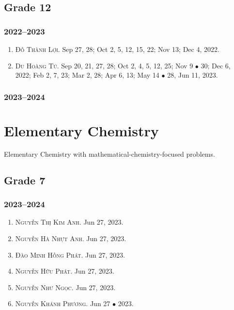 \documentclass{article}
\begin{document}

\subsection{Grade 12}

\subsubsection{2022--2023}

\begin{enumerate}
	\item \textsc{Đỗ Thành Lợi.} {\sf[In]} Sep 27, 28; Oct 2, 5, 12, 15, 22; Nov 13; Dec 4, 2022. {\sf[Out]}
	\item \textsc{Du Hoàng Tú.} {\sf[In]} Sep 20, 21, 27, 28; Oct 2, 4, 5, 12, 25; Nov 9 $\bullet$ 30; Dec 6, 2022; Feb 2, 7, 23; Mar 2, 28; Apr 6, 13; May 14 $\bullet$ 28, Jun 11, 2023. {\sf[Out]}
\end{enumerate}

\subsubsection{2023--2024}


\section{Elementary Chemistry}
Elementary Chemistry with mathematical-chemistry-focused problems.

\subsection{Grade 7}

\subsubsection{2023--2024}

\begin{enumerate}
	\item \textsc{Nguyễn Thị Kim Anh.} {\sf[In]} Jun 27, 2023.
	\item \textsc{Nguyễn Hà Nhựt Anh.} {\sf[In]} Jun 27, 2023.
	\item \textsc{Đào Minh Hồng Phát.} {\sf[In]} Jun 27, 2023.
	\item \textsc{Nguyễn Hữu Phát.} {\sf[In]} Jun 27, 2023.
	\item \textsc{Nguyễn Như Ngọc.} {\sf[In]} Jun 27, 2023.
	\item \textsc{Nguyễn Khánh Phương.} {\sf[In]} Jun 27 $\bullet$ 2023.
\end{enumerate}
\end{document}
